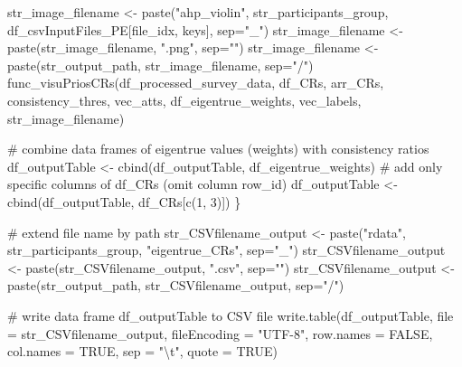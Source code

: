 \documentclass[
]{article}
\newenvironment{Shaded}{\begin{snugshade}}{\end{snugshade}}
\newcommand{\AttributeTok}[1]{\textcolor[rgb]{0.00,0.34,0.68}{#1}}
\newcommand{\CommentTok}[1]{\textcolor[rgb]{0.54,0.53,0.53}{#1}}
\newcommand{\ConstantTok}[1]{\textcolor[rgb]{0.67,0.33,0.00}{#1}}
\newcommand{\DecValTok}[1]{\textcolor[rgb]{0.69,0.50,0.00}{#1}}
\newcommand{\FunctionTok}[1]{\textcolor[rgb]{0.39,0.29,0.61}{#1}}
\newcommand{\NormalTok}[1]{\textcolor[rgb]{0.12,0.11,0.11}{#1}}
\newcommand{\OtherTok}[1]{\textcolor[rgb]{0.00,0.43,0.16}{#1}}
\newcommand{\SpecialCharTok}[1]{\textcolor[rgb]{0.24,0.68,0.91}{#1}}
\newcommand{\StringTok}[1]{\textcolor[rgb]{0.75,0.01,0.01}{#1}}
\begin{document}
\begin{Shaded}
\begin{Highlighting}[]
\NormalTok{  str\_image\_filename }\OtherTok{\textless{}{-}} \FunctionTok{paste}\NormalTok{(}\StringTok{"ahp\_violin"}\NormalTok{, str\_participants\_group, df\_csvInputFiles\_PE[file\_idx, keys], }\AttributeTok{sep=}\StringTok{"\_"}\NormalTok{)}
\NormalTok{  str\_image\_filename }\OtherTok{\textless{}{-}} \FunctionTok{paste}\NormalTok{(str\_image\_filename, }\StringTok{".png"}\NormalTok{, }\AttributeTok{sep=}\StringTok{""}\NormalTok{)}
\NormalTok{  str\_image\_filename }\OtherTok{\textless{}{-}} \FunctionTok{paste}\NormalTok{(str\_output\_path, str\_image\_filename, }\AttributeTok{sep=}\StringTok{"/"}\NormalTok{)}
  \FunctionTok{func\_visuPriosCRs}\NormalTok{(df\_processed\_survey\_data, df\_CRs, arr\_CRs, consistency\_thres, vec\_atts, df\_eigentrue\_weights, vec\_labels, str\_image\_filename)}
  
  \CommentTok{\# combine data frames of eigentrue values (weights) with consistency ratios}
\NormalTok{  df\_outputTable }\OtherTok{\textless{}{-}} \FunctionTok{cbind}\NormalTok{(df\_outputTable, df\_eigentrue\_weights)}
  \CommentTok{\# add only specific columns of \textquotesingle{}df\_CRs\textquotesingle{} (omit column \textquotesingle{}row\_id\textquotesingle{})}
\NormalTok{  df\_outputTable }\OtherTok{\textless{}{-}} \FunctionTok{cbind}\NormalTok{(df\_outputTable, df\_CRs[}\FunctionTok{c}\NormalTok{(}\DecValTok{1}\NormalTok{, }\DecValTok{3}\NormalTok{)])}
\NormalTok{\}}

\CommentTok{\# extend file name by path}
\NormalTok{str\_CSVfilename\_output }\OtherTok{\textless{}{-}} \FunctionTok{paste}\NormalTok{(}\StringTok{"rdata"}\NormalTok{, str\_participants\_group, }\StringTok{"eigentrue\_CRs"}\NormalTok{, }\AttributeTok{sep=}\StringTok{"\_"}\NormalTok{)}
\NormalTok{str\_CSVfilename\_output }\OtherTok{\textless{}{-}} \FunctionTok{paste}\NormalTok{(str\_CSVfilename\_output, }\StringTok{".csv"}\NormalTok{, }\AttributeTok{sep=}\StringTok{""}\NormalTok{)}
\NormalTok{str\_CSVfilename\_output }\OtherTok{\textless{}{-}} \FunctionTok{paste}\NormalTok{(str\_output\_path, str\_CSVfilename\_output, }\AttributeTok{sep=}\StringTok{"/"}\NormalTok{)}

\CommentTok{\# write data frame \textquotesingle{}df\_outputTable\textquotesingle{} to CSV file}
\FunctionTok{write.table}\NormalTok{(df\_outputTable, }\AttributeTok{file =}\NormalTok{ str\_CSVfilename\_output,}
            \AttributeTok{fileEncoding =} \StringTok{"UTF{-}8"}\NormalTok{, }\AttributeTok{row.names =} \ConstantTok{FALSE}\NormalTok{,}
            \AttributeTok{col.names =} \ConstantTok{TRUE}\NormalTok{, }\AttributeTok{sep =} \StringTok{"}\SpecialCharTok{\textbackslash{}t}\StringTok{"}\NormalTok{, }\AttributeTok{quote =} \ConstantTok{TRUE}\NormalTok{)}
\end{Highlighting}
\end{Shaded}
\end{document}
